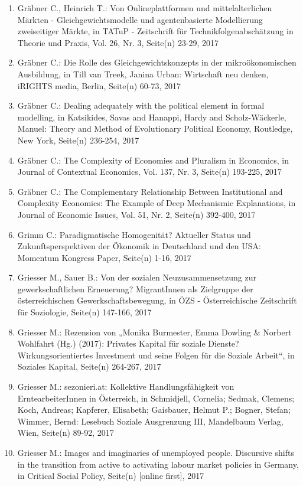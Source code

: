 \begin{enumerate}
	 \item Gräbner C., Heinrich T.: Von Onlineplattformen und mittelalterlichen Märkten - Gleichgewichtsmodelle und agentenbasierte Modellierung zweiseitiger Märkte, in TATuP - Zeitschrift für Technikfolgenabschätzung in Theorie und Praxis, Vol. 26, Nr. 3, Seite(n) 23-29, 2017
	 \item Gräbner C.: Die Rolle des Gleichgewichtskonzepts in der mikroökonomischen Ausbildung, in Till van Treek, Janina Urban: Wirtschaft neu denken, iRIGHTS media, Berlin, Seite(n) 60-73, 2017
	 \item Gräbner C.: Dealing adequately with the political element in formal modelling, in Katsikides, Savas and Hanappi, Hardy and Scholz-Wäckerle, Manuel: Theory and Method of Evolutionary Political Economy, Routledge, New York, Seite(n) 236-254, 2017
	 \item Gräbner C.: The Complexity of Economies and Pluralism in Economics, in Journal of Contextual Economics, Vol. 137, Nr. 3, Seite(n) 193-225, 2017
	 \item Gräbner C.: The Complementary Relationship Between Institutional and Complexity Economics: The Example of Deep Mechanismic Explanations, in Journal of Economic Issues, Vol. 51, Nr. 2, Seite(n) 392-400, 2017
	 \item Grimm C.: Paradigmatische Homogenität? Aktueller Status und Zukunftsperspektiven der Ökonomik in Deutschland und den USA: Momentum Kongress Paper, Seite(n) 1-16, 2017
	 \item Griesser M., Sauer B.: Von der sozialen Neuzusammensetzung zur gewerkschaftlichen Erneuerung? MigrantInnen als Zielgruppe der österreichischen Gewerkschaftsbewegung, in ÖZS - Österreichische Zeitschrift für Soziologie, Seite(n) 147-166, 2017
	 \item Griesser M.: Rezension von „Monika Burmester, Emma Dowling & Norbert Wohlfahrt (Hg.) (2017): Privates Kapital für soziale Dienste? Wirkungsorientiertes Investment und seine Folgen für die Soziale Arbeit“, in Soziales Kapital, Seite(n) 264-267, 2017
	 \item Griesser M.: sezonieri.at: Kollektive Handlungsfähigkeit von ErntearbeiterInnen in Österreich, in Schmidjell, Cornelia; Sedmak, Clemens; Koch, Andreas; Kapferer, Elisabeth; Gaisbauer, Helmut P.; Bogner, Stefan; Wimmer, Bernd: Lesebuch Soziale Ausgrenzung III, Mandelbaum Verlag, Wien, Seite(n) 89-92, 2017
	 \item Griesser M.: Images and imaginaries of unemployed people. Discursive shifts in the transition from active to activating labour market policies in Germany, in Critical Social Policy, Seite(n) [online first], 2017

\end{enumerate}
